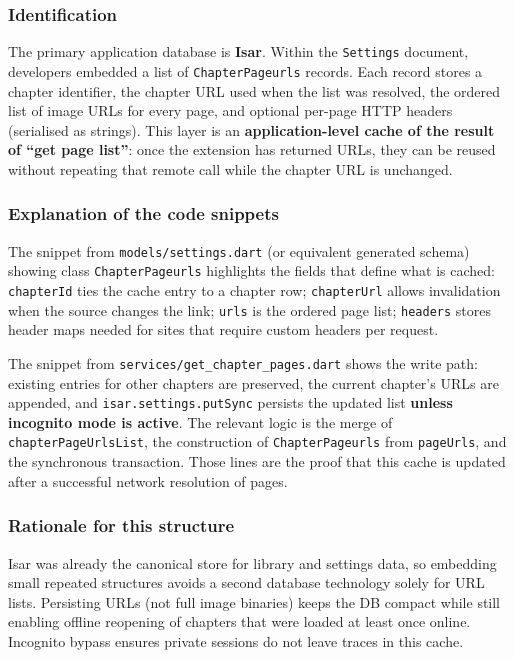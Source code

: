 \subsubsection*{Identification}
The primary application database is \textbf{Isar}. Within the \texttt{Settings} document, developers embedded a list of \texttt{ChapterPageurls} records. Each record stores a chapter identifier, the chapter URL used when the list was resolved, the ordered list of image URLs for every page, and optional per-page HTTP headers (serialised as strings). This layer is an \textbf{application-level cache of the result of ``get page list''}: once the extension has returned URLs, they can be reused without repeating that remote call while the chapter URL is unchanged.

\subsubsection*{Explanation of the code snippets}
The snippet from \texttt{models/settings.dart} (or equivalent generated schema) showing class \texttt{ChapterPageurls} highlights the fields that define what is cached: \texttt{chapterId} ties the cache entry to a chapter row; \texttt{chapterUrl} allows invalidation when the source changes the link; \texttt{urls} is the ordered page list; \texttt{headers} stores header maps needed for sites that require custom headers per request.

The snippet from \texttt{services/get\_chapter\_pages.dart} shows the write path: existing entries for other chapters are preserved, the current chapter's URLs are appended, and \texttt{isar.settings.putSync} persists the updated list \textbf{unless incognito mode is active}. The relevant logic is the merge of \texttt{chapterPageUrlsList}, the construction of \texttt{ChapterPageurls} from \texttt{pageUrls}, and the synchronous transaction. Those lines are the proof that this cache is updated after a successful network resolution of pages.

\subsubsection*{Rationale for this structure}
Isar was already the canonical store for library and settings data, so embedding small repeated structures avoids a second database technology solely for URL lists. Persisting URLs (not full image binaries) keeps the DB compact while still enabling offline reopening of chapters that were loaded at least once online. Incognito bypass ensures private sessions do not leave traces in this cache.

